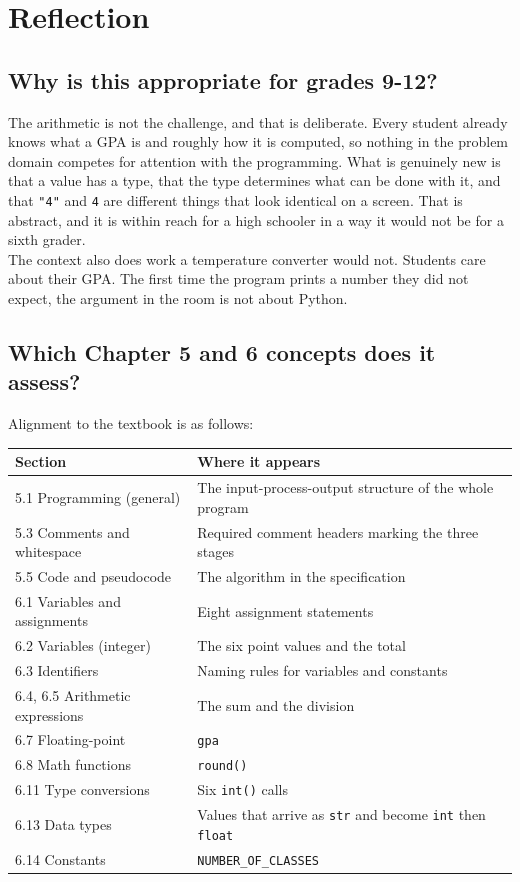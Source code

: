 \documentclass[11pt]{article}
\begin{document}
\section{Reflection}
\label{sec:org8acf070}

\subsection{Why is this appropriate for grades 9-12?}
\label{sec:org600d315}

The arithmetic is not the challenge, and that is deliberate. Every student already knows what a GPA is and roughly how it is computed, so nothing in the problem domain competes for attention with the programming. What is genuinely new is that a value has a type, that the type determines what can be done with it, and that \texttt{"4"} and \texttt{4} are different things that look identical on a screen. That is abstract, and it is within reach for a high schooler in a way it would not be for a sixth grader.\\

The context also does work a temperature converter would not. Students care about their GPA. The first time the program prints a number they did not expect, the argument in the room is not about Python.\\
\subsection{Which Chapter 5 and 6 concepts does it assess?}
\label{sec:orgef69ca2}

Alignment to the textbook is as follows:\\

\begin{center}
\begin{tabular}{ll}
Section & Where it appears\\
\hline
5.1 Programming (general) & The input-process-output structure of the whole program\\
5.3 Comments and whitespace & Required comment headers marking the three stages\\
5.5 Code and pseudocode & The algorithm in the specification\\
6.1 Variables and assignments & Eight assignment statements\\
6.2 Variables (integer) & The six point values and the total\\
6.3 Identifiers & Naming rules for variables and constants\\
6.4, 6.5 Arithmetic expressions & The sum and the division\\
6.7 Floating-point & \texttt{gpa}\\
6.8 Math functions & \texttt{round()}\\
6.11 Type conversions & Six \texttt{int()} calls\\
6.13 Data types & Values that arrive as \texttt{str} and become \texttt{int} then \texttt{float}\\
6.14 Constants & \texttt{NUMBER\_OF\_CLASSES}\\
\end{tabular}
\end{center}
\end{document}

